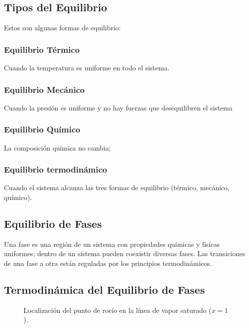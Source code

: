     \subsection{Tipos del Equilibrio}
        Estos son algunas formas de equilibrio:
        \subsubsection{Equilibrio Térmico}
            Cuando la temperatura es uniforme en todo el sistema.
        \subsubsection{Equilibrio Mecánico}
            Cuando la presión es uniforme y no hay fuerzas que desequilibren el sistema
        \subsubsection{Equilibrio Químico}
            La composición química no cambia;
        \subsubsection{Equilibrio termodinámico}
            Cuando el sistema alcanza las tres formas de equilibrio (térmico, mecánico, químico).

        \subsection{Equilibrio de Fases}
            Una fase es una región de un sistema con propiedades químicas y físicas uniformes; dentro de un sistema pueden coexistir diversas fases. Las transiciones de una fase a otra están reguladas por los principios termodinámicos.

            \eqnClausiusClapeyron
    \subsection{Termodinámica del Equilibrio de Fases}


        \begin{figure}[h]
            \centering
            
            \caption{Localización del punto de rocío en la línea de vapor saturado ($x=1$).}
        \end{figure}
        


